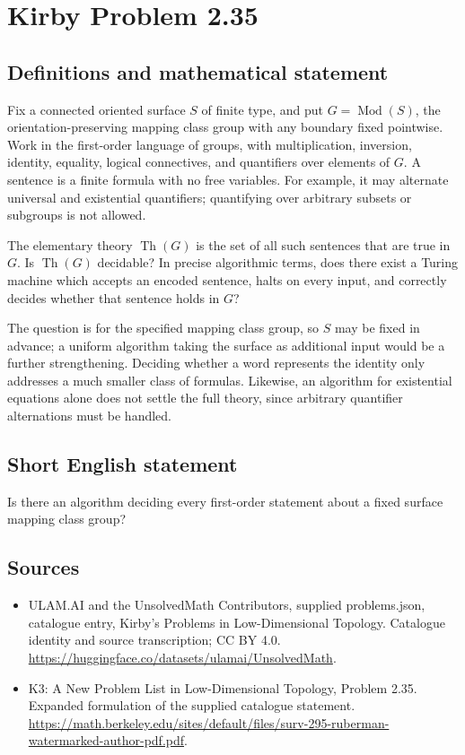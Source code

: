 \documentclass[11pt,a4paper]{article}
\begin{document}
\section*{Kirby Problem 2.35}\label{statement}

\subsection{Definitions and mathematical statement}
Fix a connected oriented surface $S$ of finite type, and put
$G=\operatorname{Mod}(S)$, the orientation-preserving mapping class group
with any boundary fixed pointwise. Work in the first-order language of groups,
with multiplication, inversion, identity, equality, logical connectives, and
quantifiers over elements of $G$. A sentence is a finite formula with no free
variables. For example, it may alternate universal and existential quantifiers;
quantifying over arbitrary subsets or subgroups is not allowed.

The elementary theory $\operatorname{Th}(G)$ is the set of all such sentences
that are true in $G$. Is $\operatorname{Th}(G)$ decidable? In precise algorithmic
terms, does there exist a Turing machine which accepts an encoded sentence,
halts on every input, and correctly decides whether that sentence holds in $G$?

The question is for the specified mapping class group, so $S$ may be fixed
in advance; a uniform algorithm taking the surface as additional input would
be a further strengthening. Deciding whether a word represents the identity
only addresses a much smaller class of formulas. Likewise, an algorithm for
existential equations alone does not settle the full theory, since arbitrary
quantifier alternations must be handled.
\subsection{Short English statement}
Is there an algorithm deciding every first-order statement about a fixed surface mapping class group?
\subsection{Sources}
\begin{itemize}
\item[S1] ULAM.AI and the UnsolvedMath Contributors, supplied problems.json, catalogue entry, Kirby's Problems in Low-Dimensional Topology. Catalogue identity and source transcription; CC BY 4.0.
\url{https://huggingface.co/datasets/ulamai/UnsolvedMath}.
\item[S2] K3: A New Problem List in Low-Dimensional Topology, Problem 2.35. Expanded formulation of the supplied catalogue statement.
\url{https://math.berkeley.edu/sites/default/files/surv-295-ruberman-watermarked-author-pdf.pdf}.
\end{itemize}
\end{document}
